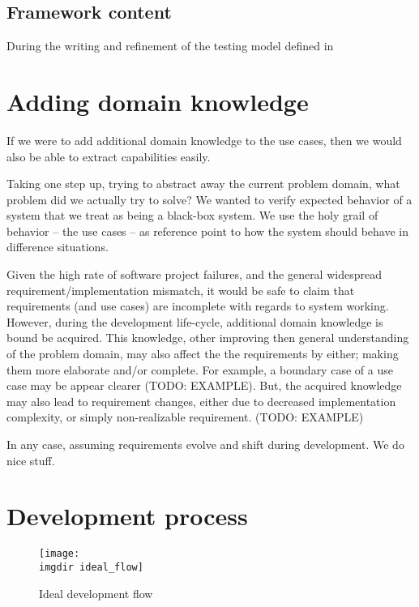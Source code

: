 \subsection{Framework content}

During the writing and refinement of the testing model defined in 


\section{Adding domain knowledge}
If we were to add additional domain knowledge to the use cases, then we would also be able to extract capabilities easily.

Taking one step up, trying to abstract away the current problem domain, what problem did we actually try to solve? We wanted to verify expected behavior of a system that we treat as being a black-box system. We use the holy grail of behavior -- the use cases -- as reference point to how the system should behave in difference situations.


Given the high rate of software project failures, and the general widespread requirement/implementation mismatch, it would be safe to claim that requirements (and use cases) are incomplete with regards to system working. However, during the development life-cycle, additional domain knowledge is bound be acquired. This knowledge, other improving then general understanding of the problem domain, may also affect the the requirements by either; making them more elaborate and/or complete. For example, a boundary case of a use case may be appear clearer (TODO: EXAMPLE). But, the acquired knowledge may also lead to requirement changes, either due to decreased implementation complexity, or simply non-realizable requirement. (TODO: EXAMPLE)

In any case, assuming requirements evolve and shift during development. We do nice stuff.

\section{Development process}
\begin{figure}[ht]
\centering
\texttt{[image: \\imgdir ideal\_flow]}
\caption{Ideal development flow}
\label{fig:ideal_flow}
\end{figure}

